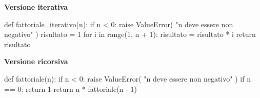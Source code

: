 \noindent\hspace*{2mm}%
\begin{minipage}[t]{\dimexpr\linewidth/2-4mm\relax}
\vspace{0pt}
\textbf{Versione iterativa}
\begin{unipdcode}[language=Python,
  basicstyle=\ttfamily\scriptsize,
  numbers=none,
  xleftmargin=0pt,
  xrightmargin=0pt,
  framexleftmargin=0.3em]
def fattoriale_iterativo(n):
    if n < 0:
        raise ValueError(
            "n deve essere non negativo"
        )
    risultato = 1
    for i in range(1, n + 1):
        risultato = risultato * i
    return risultato
\end{unipdcode}
\end{minipage}%
\hspace*{4mm}%
\begin{minipage}[t]{\dimexpr\linewidth/2-4mm\relax}
\vspace{0pt}
\textbf{Versione ricorsiva}
\begin{unipdcode}[language=Python,
  basicstyle=\ttfamily\scriptsize,
  numbers=none,
  xleftmargin=0pt,
  xrightmargin=0pt,
  framexleftmargin=0.3em]
def fattoriale(n):
    if n < 0:
        raise ValueError(
            "n deve essere non negativo"
        )
    if n == 0:
        return 1
    return n * fattoriale(n - 1)
\end{unipdcode}
\end{minipage}
